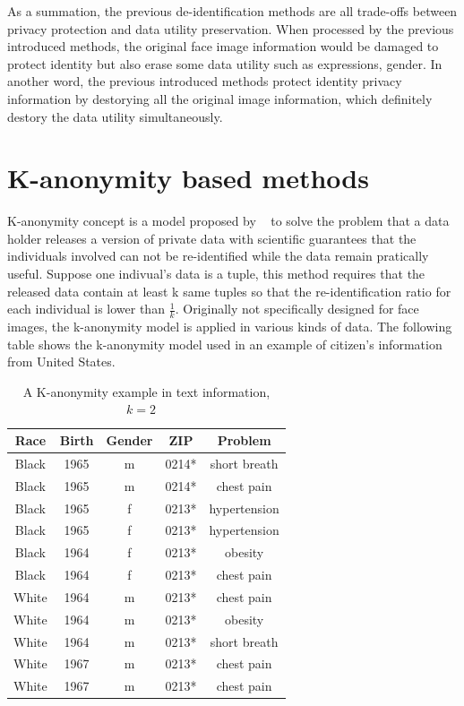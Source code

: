	\par
	As a summation, the previous de-identification methods are all trade-offs between privacy protection and data utility preservation. When processed by the previous introduced methods, the original face image information would be damaged to protect identity but also erase some data utility such as expressions, gender. In another word, the previous introduced methods protect identity privacy information by destorying all the original image information, which definitely destory the data utility simultaneously. 

\section{K-anonymity based methods}
	K-anonymity concept is a model proposed by ~\cite{Sweeney02} to solve the problem that a data holder releases a version of private data with scientific guarantees that the individuals involved can not be re-identified while the data remain pratically useful. Suppose one indivual's data is a tuple, this method requires that the released data contain at least k same tuples so that the re-identification ratio for each individual is lower than $\frac{1}{k}$. Originally not specifically designed for face images, the k-anonymity model is applied in various kinds of data. The following table shows the k-anonymity model used in an example of citizen's information from United States. \newline
		\begin{table}[!htb]
		\centering
			\begin{tabular}{|c|c|c|c|c|}
				\hline
				\textbf{Race} & \textbf{Birth} & \textbf{Gender} & \textbf{ZIP} & \textbf{Problem} \\
				\hline
				Black & 1965 & m & 0214* & short breath \\
				\hline
				Black & 1965 & m & 0214* & chest pain \\
				\hline
				Black & 1965 & f & 0213* & hypertension \\
				\hline
				Black & 1965 & f & 0213* & hypertension \\
				\hline
				Black & 1964 & f & 0213* & obesity \\
				\hline
				Black & 1964 & f & 0213* & chest pain \\
				\hline
				White & 1964 & m & 0213* & chest pain \\
				\hline
				White & 1964 & m & 0213* & obesity \\
				\hline
				White & 1964 & m & 0213* & short breath \\
				\hline
				White & 1967 & m & 0213* & chest pain \\
				\hline
				White & 1967 & m & 0213* & chest pain \\
				\hline
			\end{tabular}
			\caption{A K-anonymity example in text information, $k = 2$ ~\cite{Sweeney02}} 
		\end{table}	

